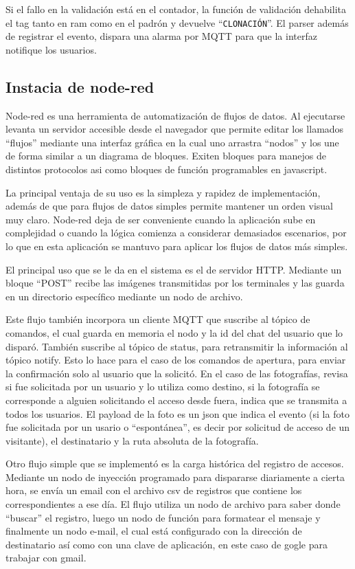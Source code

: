 Si el fallo en la validación está en el contador, la función de validación dehabilita el tag tanto en ram como en el padrón y devuelve \enquote{\texttt{CLONACIÓN}}. El parser además de registrar el evento, dispara una alarma por MQTT para que la interfaz notifique los usuarios.

\subsection{Instacia de node-red}

Node-red es una herramienta de automatización de flujos de datos. Al ejecutarse levanta un servidor accesible desde el navegador que permite editar los llamados \enquote{flujos} mediante una interfaz gráfica en la cual uno arrastra \enquote{nodos} y los une de forma similar a un diagrama de bloques. Exiten bloques para manejos de distintos protocolos asi como bloques de función programables en javascript.

La principal ventaja de su uso es la simpleza y rapidez de implementación, además de que para flujos de datos simples permite mantener un orden visual muy claro. Node-red deja de ser conveniente cuando la aplicación sube en complejidad o cuando la lógica comienza a considerar demasiados escenarios, por lo que en esta aplicación se mantuvo para aplicar los flujos de datos más simples.

El principal uso que se le da en el sistema es el de servidor HTTP. Mediante un bloque \enquote{POST} recibe las imágenes transmitidas por los terminales y las guarda en un directorio específico mediante un nodo de archivo.

Este flujo también incorpora un cliente MQTT que suscribe al tópico de comandos, el cual guarda en memoria el nodo y la id del chat del usuario que lo disparó.
También suscribe al tópico de status, para retransmitir la información al tópico notify.
Esto lo hace para el caso de los comandos de apertura, para enviar la confirmación solo al usuario que la solicitó. En el caso de las fotografías, revisa si fue solicitada por un usuario y lo utiliza como destino, si la fotografía se corresponde a alguien solicitando el acceso desde fuera, indica que se transmita a todos los usuarios.
El payload de la foto es un json que indica el evento (si la foto fue solicitada por un usario o \enquote{espontánea}, es decir por solicitud de acceso de un visitante), el destinatario y la ruta absoluta de la fotografía.

Otro flujo simple que se implementó es la carga histórica del registro de accesos. Mediante un nodo de inyección programado para dispararse diariamente a cierta hora, se envía un email con el archivo csv de registros que contiene los correspondientes a ese día.
El flujo utiliza un nodo de archivo para saber donde \enquote{buscar} el registro, luego un nodo de función para formatear el mensaje y finalmente un nodo e-mail, el cual está configurado con la dirección de destinatario así como con una clave de aplicación, en este caso de gogle para trabajar con gmail.

